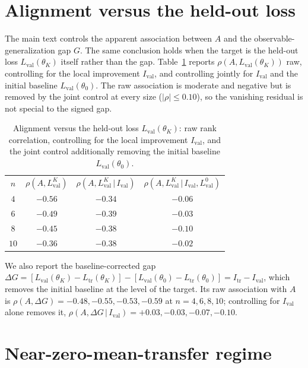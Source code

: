 \documentclass[aps,pra,onecolumn,superscriptaddress,10pt]{revtex4-2}
\newcommand{\Itr}{I_{\mathrm{tr}}}
\newcommand{\Ival}{I_{\mathrm{val}}}
\newcommand{\thetaz}{\theta_0}
\newcommand{\thetaK}{\theta_K}
\newcommand{\Ltr}{L_{\mathrm{tr}}}
\newcommand{\Lval}{L_{\mathrm{val}}}
\begin{document}
\section{Alignment versus the held-out loss}
\label{sm:heldout}

The main text controls the apparent association between $A$ and the observable-generalization gap
$G$. The same conclusion holds when the target is the held-out loss $\Lval(\thetaK)$ itself rather
than the gap. Table~\ref{tab:heldout} reports $\rho(A,\Lval(\thetaK))$ raw, controlling for the local
improvement $\Ival$, and controlling jointly for $\Ival$ and the initial baseline $\Lval(\thetaz)$.
The raw association is moderate and negative but is removed by the joint control at every size
($|\rho|\le0.10$), so the vanishing residual is not special to the signed gap.

\begin{table}[h]
\caption{\label{tab:heldout}%
Alignment versus the held-out loss $\Lval(\thetaK)$: raw rank correlation, controlling for the local
improvement $\Ival$, and the joint control additionally removing the initial baseline
$\Lval(\thetaz)$.}
\begin{ruledtabular}
\begin{tabular}{cccc}
$n$ & $\rho(A,\Lval^{K})$ & $\rho(A,\Lval^{K}\,|\,\Ival)$ & $\rho(A,\Lval^{K}\,|\,\Ival,\Lval^{0})$ \\
\colrule
$4$  & $-0.56$ & $-0.34$ & $-0.06$ \\
$6$  & $-0.49$ & $-0.39$ & $-0.03$ \\
$8$  & $-0.45$ & $-0.38$ & $-0.10$ \\
$10$ & $-0.36$ & $-0.38$ & $-0.02$ \\
\end{tabular}
\end{ruledtabular}
\end{table}

We also report the baseline-corrected gap $\Delta G=[\Lval(\thetaK)-\Ltr(\thetaK)]-
[\Lval(\thetaz)-\Ltr(\thetaz)]=\Itr-\Ival$, which removes the initial baseline at the level of the
target. Its raw association with $A$ is $\rho(A,\Delta G)=-0.48,-0.55,-0.53,-0.59$ at $n=4,6,8,10$;
controlling for $\Ival$ alone removes it, $\rho(A,\Delta G\,|\,\Ival)=+0.03,-0.03,-0.07,-0.10$.

\section{Near-zero-mean-transfer regime}
\label{sm:transfer}
\end{document}
